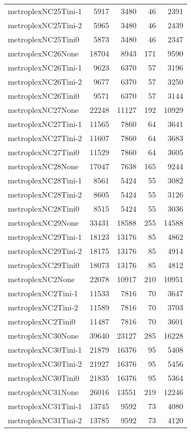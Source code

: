 \begin{longtable}{lrrrr}
metroplexNC25Tini-1 & 5917 & 3480 & 46 & 2391 \\
metroplexNC25Tini-2 & 5965 & 3480 & 46 & 2439 \\
metroplexNC25Tini0 & 5873 & 3480 & 46 & 2347 \\
metroplexNC26None & 18704 & 8943 & 171 & 9590 \\
metroplexNC26Tini-1 & 9623 & 6370 & 57 & 3196 \\
metroplexNC26Tini-2 & 9677 & 6370 & 57 & 3250 \\
metroplexNC26Tini0 & 9571 & 6370 & 57 & 3144 \\
metroplexNC27None & 22248 & 11127 & 192 & 10929 \\
metroplexNC27Tini-1 & 11565 & 7860 & 64 & 3641 \\
metroplexNC27Tini-2 & 11607 & 7860 & 64 & 3683 \\
metroplexNC27Tini0 & 11529 & 7860 & 64 & 3605 \\
metroplexNC28None & 17047 & 7638 & 165 & 9244 \\
metroplexNC28Tini-1 & 8561 & 5424 & 55 & 3082 \\
metroplexNC28Tini-2 & 8605 & 5424 & 55 & 3126 \\
metroplexNC28Tini0 & 8515 & 5424 & 55 & 3036 \\
metroplexNC29None & 33431 & 18588 & 255 & 14588 \\
metroplexNC29Tini-1 & 18123 & 13176 & 85 & 4862 \\
metroplexNC29Tini-2 & 18175 & 13176 & 85 & 4914 \\
metroplexNC29Tini0 & 18073 & 13176 & 85 & 4812 \\
metroplexNC2None & 22078 & 10917 & 210 & 10951 \\
metroplexNC2Tini-1 & 11533 & 7816 & 70 & 3647 \\
metroplexNC2Tini-2 & 11589 & 7816 & 70 & 3703 \\
metroplexNC2Tini0 & 11487 & 7816 & 70 & 3601 \\
metroplexNC30None & 39640 & 23127 & 285 & 16228 \\
metroplexNC30Tini-1 & 21879 & 16376 & 95 & 5408 \\
metroplexNC30Tini-2 & 21927 & 16376 & 95 & 5456 \\
metroplexNC30Tini0 & 21835 & 16376 & 95 & 5364 \\
metroplexNC31None & 26016 & 13551 & 219 & 12246 \\
metroplexNC31Tini-1 & 13745 & 9592 & 73 & 4080 \\
metroplexNC31Tini-2 & 13785 & 9592 & 73 & 4120 \\

\end{longtable}
